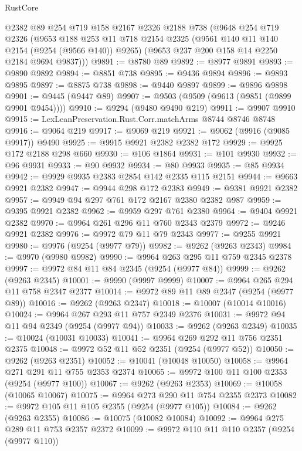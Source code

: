 \begin{lexlean}{RustCore}
\begin{coremodule}
    @2382
    @89
    @254
    @719
    @158
    @2167
    @2326
    @2188
    @738
    (@9648
      @254
      @719
      @2326
      (@9653
        @188
        @253
        @11
        @718
        @2154
        @2325
        (@9561 @140 @11 @140 @2154 (@9254 (@9566 @140)) @9265)
        (@9653 @237 @200 @158 @14 @2250 @2184 @9694 @9837)))
@9891 := @8780 @89
@9892 := @8977 @9891
@9893 := @9890 @9892
@9894 := @8851 @738
@9895 := @9436 @9894
@9896 := @9893 @9895
@9897 := @8875 @738
@9898 := @9440 @9897
@9899 := @9896 @9898
@9901 := @9445 (@9447 @89)
@9907 := @9503 (@9509 (@9613 (@9851 (@9899 @9901 @9454))))
@9910 := @9294 (@9480 @9490 @219)
@9911 := @9907 @9910
@9915 := LexLeanPreservation.Rust.Corr.matchArms @8744 @8746 @8748
@9916 := @9064 @219
@9917 := @9069 @219
@9921 := @9062 (@9916 (@9085 @9917)) @9490
@9925 := @9915 @9921 @2382 @2382 @172
@9929 := @9925 @172 @2188 @298 @660
@9930 := @106 @1864
@9931 := @101 @9930
@9932 := @96 @9931
@9933 := @90 @9932
@9934 := @80 @9933
@9935 := @85 @9934
@9942 := @9929 @9935 @2383 @2854 @142 @2335 @115 @2151
@9944 := @9663 @9921 @2382
@9947 := @9944 @298 @172 @2383
@9949 := @9381 @9921 @2382
@9957 := @9949 @94 @297 @761 @172 @2167 @2380 @2382 @987
@9959 := @9395 @9921 @2382
@9962 := @9959 @297 @761 @2380
@9964 := @9404 @9921 @2382
@9970 := @9964 @261 @296 @11 @760 @2343 @2379
@9972 := @9246 @9921 @2382
@9976 := @9972 @79 @11 @79 @2343
@9977 := @9255 @9921
@9980 := @9976 (@9254 (@9977 @79))
@9982 := @9262 (@9263 @2343)
@9984 := @9970 (@9980 @9982)
@9990 := @9964 @263 @295 @11 @759 @2345 @2378
@9997 := @9972 @84 @11 @84 @2345 (@9254 (@9977 @84))
@9999 := @9262 (@9263 @2345)
@10001 := @9990 (@9997 @9999)
@10007 := @9964 @265 @294 @11 @758 @2347 @2377
@10014 := @9972 @89 @11 @89 @2347 (@9254 (@9977 @89))
@10016 := @9262 (@9263 @2347)
@10018 := @10007 (@10014 @10016)
@10024 := @9964 @267 @293 @11 @757 @2349 @2376
@10031 := @9972 @94 @11 @94 @2349 (@9254 (@9977 @94))
@10033 := @9262 (@9263 @2349)
@10035 := @10024 (@10031 @10033)
@10041 := @9964 @269 @292 @11 @756 @2351 @2375
@10048 := @9972 @52 @11 @52 @2351 (@9254 (@9977 @52))
@10050 := @9262 (@9263 @2351)
@10052 := @10041 (@10048 @10050)
@10058 := @9964 @271 @291 @11 @755 @2353 @2374
@10065 := @9972 @100 @11 @100 @2353 (@9254 (@9977 @100))
@10067 := @9262 (@9263 @2353)
@10069 := @10058 (@10065 @10067)
@10075 := @9964 @273 @290 @11 @754 @2355 @2373
@10082 := @9972 @105 @11 @105 @2355 (@9254 (@9977 @105))
@10084 := @9262 (@9263 @2355)
@10086 := @10075 (@10082 @10084)
@10092 := @9964 @275 @289 @11 @753 @2357 @2372
@10099 := @9972 @110 @11 @110 @2357 (@9254 (@9977 @110))

\end{coremodule}
\end{lexlean}
